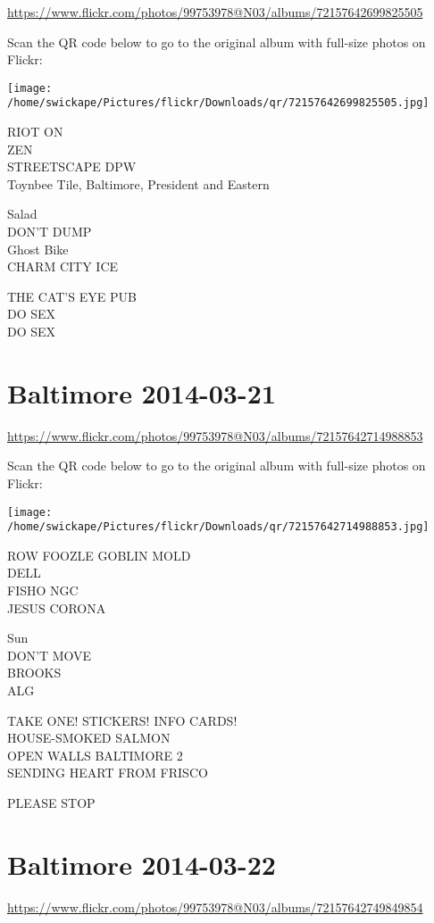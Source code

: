 \documentclass[10pt,letterpaper]{article}
\begin{document}
\url{https://www.flickr.com/photos/99753978@N03/albums/72157642699825505}

Scan the QR code below to go to the original album with full-size photos on Flickr:

\texttt{[image: /home/swickape/Pictures/flickr/Downloads/qr/72157642699825505.jpg]}


RIOT ON\\
ZEN\\
STREETSCAPE DPW\\
Toynbee Tile, Baltimore, President and Eastern

Salad\\
DON'T DUMP\\
Ghost Bike\\
CHARM CITY ICE

THE CAT'S EYE PUB\\
DO SEX\\
DO SEX


\section*{Baltimore 2014-03-21}

\url{https://www.flickr.com/photos/99753978@N03/albums/72157642714988853}

Scan the QR code below to go to the original album with full-size photos on Flickr:

\texttt{[image: /home/swickape/Pictures/flickr/Downloads/qr/72157642714988853.jpg]}


ROW FOOZLE GOBLIN MOLD\\
DELL\\
FISHO NGC\\
JESUS CORONA

Sun\\
DON'T MOVE\\
BROOKS\\
ALG

TAKE ONE!  STICKERS!  INFO CARDS!\\
HOUSE{-}SMOKED SALMON\\
OPEN WALLS BALTIMORE 2\\
SENDING HEART FROM FRISCO

PLEASE STOP


\section*{Baltimore 2014-03-22}

\url{https://www.flickr.com/photos/99753978@N03/albums/72157642749849854}
\end{document}
